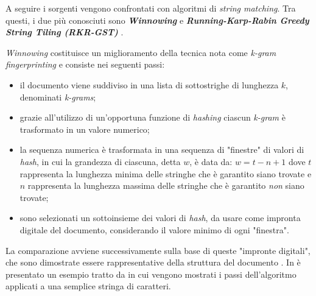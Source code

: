 A seguire i sorgenti vengono confrontati con algoritmi di \textit{string matching}.
%
Tra questi, i due più conosciuti sono \textbf{\textit{Winnowing}} \cite{winnowing} e \textbf{\textit{Running-Karp-Rabin Greedy String Tiling (RKR-GST)}} \cite{wise-running-93}.

\textit{Winnowing} costituisce un miglioramento della tecnica nota come \textit{k-gram fingerprinting} e consiste nei seguenti passi:
\begin{itemize}
    \item il documento viene suddiviso in una lista di sottostrighe di lunghezza $k$, denominati \textit{k-grams};

    \item grazie all'utilizzo di un'opportuna funzione di \textit{hashing} ciascun \textit{k-gram} è trasformato in un valore numerico;
    
    \item la sequenza numerica è trasformata in una sequenza di "finestre" di valori di \textit{hash}, in cui la grandezza di ciascuna, detta $w$, è data da: $w = t - n + 1$ dove $t$ rappresenta la lunghezza minima delle stringhe che è garantito siano trovate e $n$ rappresenta la lunghezza massima delle stringhe che è garantito \textit{non} siano trovate;
    
    \item sono selezionati un sottoinsieme dei valori di \textit{hash}, da usare come impronta digitale del documento, considerando il valore minimo di ogni "finestra".
\end{itemize}

La comparazione avviene successivamente sulla base di queste "impronte digitali", che sono dimostrate essere rappresentative della struttura del documento \cite{winnowing}.
%
In  è presentato un esempio tratto da \cite{winnowing} in cui vengono mostrati i passi dell'algoritmo applicati a una semplice stringa di caratteri.

